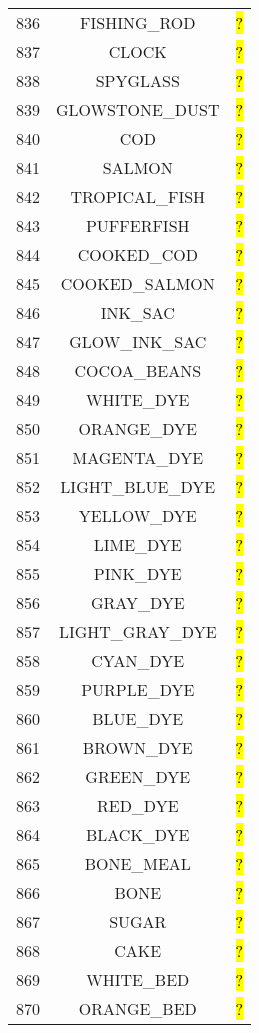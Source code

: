 \documentclass[11pt]{article}
\newcommand\myworries[1]{\sethlcolor{red}\hl{#1}}
\begin{document}
\begin{longtable}{ |c|c|c| }
836 & FISHING\_ROD & \myworries{?} \\
837 & CLOCK & \myworries{?} \\
838 & SPYGLASS & \myworries{?} \\
839 & GLOWSTONE\_DUST & \myworries{?} \\
840 & COD & \myworries{?} \\
841 & SALMON & \myworries{?} \\
842 & TROPICAL\_FISH & \myworries{?} \\
843 & PUFFERFISH & \myworries{?} \\
844 & COOKED\_COD & \myworries{?} \\
845 & COOKED\_SALMON & \myworries{?} \\
846 & INK\_SAC & \myworries{?} \\
847 & GLOW\_INK\_SAC & \myworries{?} \\
848 & COCOA\_BEANS & \myworries{?} \\
849 & WHITE\_DYE & \myworries{?} \\
850 & ORANGE\_DYE & \myworries{?} \\
851 & MAGENTA\_DYE & \myworries{?} \\
852 & LIGHT\_BLUE\_DYE & \myworries{?} \\
853 & YELLOW\_DYE & \myworries{?} \\
854 & LIME\_DYE & \myworries{?} \\
855 & PINK\_DYE & \myworries{?} \\
856 & GRAY\_DYE & \myworries{?} \\
857 & LIGHT\_GRAY\_DYE & \myworries{?} \\
858 & CYAN\_DYE & \myworries{?} \\
859 & PURPLE\_DYE & \myworries{?} \\
860 & BLUE\_DYE & \myworries{?} \\
861 & BROWN\_DYE & \myworries{?} \\
862 & GREEN\_DYE & \myworries{?} \\
863 & RED\_DYE & \myworries{?} \\
864 & BLACK\_DYE & \myworries{?} \\
865 & BONE\_MEAL & \myworries{?} \\
866 & BONE & \myworries{?} \\
867 & SUGAR & \myworries{?} \\
868 & CAKE & \myworries{?} \\
869 & WHITE\_BED & \myworries{?} \\
870 & ORANGE\_BED & \myworries{?} \\

\end{longtable}
\end{document}
